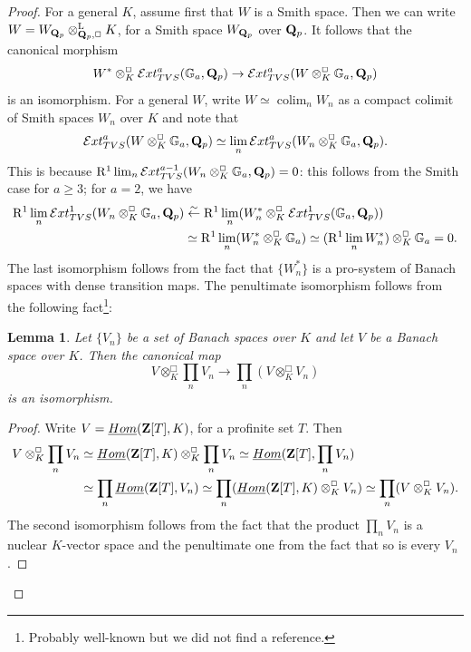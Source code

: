 \documentclass[10pt,reqno]{amsart}
\newtheorem{lemma}[equation]{Lemma}
\theoremstyle{definition}
\theoremstyle{remark}
\newcommand{\colim}{\operatorname{colim} }
\newcommand{\uHom}{\underline{{\rm{Hom}} }}
\newcommand{\LL}{\operatorname{L} }
\numberwithin{equation}{section}
\def\R{{\mathrm R}}
\def\Q{{\bf Q}} \def\Z{{\bf Z}}
\numberwithin{equation}{section}
\begin{document}
\begin{proof}
      For a general $K$,  assume first that $W$ is a Smith space. Then we can write $W=W_{\Q_p}\otimes^{\LL}_{\Q_p,\Box}K$, for a Smith space $W_{\Q_p}$ over $\Q_p$.
   It follows that the canonical morphism
   $$
   W^*\otimes^{\Box}_K    {\mathcal Ext}^a_{\rm TVS}(\mathbb{G}_a,\Q_p)\to     {\mathcal Ext}^a_{\rm TVS}(W\otimes^{\Box}_{K}\mathbb{G}_a,\Q_p)
   $$
   is an isomorphism. 
   For a general $W$,  write $W\simeq \colim_n W_n$ as a compact colimit of Smith spaces $W_n$ over $K$ and note that 
   $${\mathcal Ext}^a_{\rm TVS}(W\otimes^{\Box}_{K}\mathbb{G}_a,\Q_p)\simeq \lim_n {\mathcal Ext}^a_{\rm TVS}(W_n\otimes^{\Box}_{K}\mathbb{G}_a,\Q_p).
   $$
    This is because $\R^1\lim_n{\mathcal Ext}^{a-1}_{\rm TVS}(W_n\otimes^{\Box}_{K}\mathbb{G}_a,\Q_p)=0$: this  follows from the Smith case for $a\geq 3$; for $a=2$, we have 
   \begin{align*}
   \R^1\lim_n{\mathcal Ext}^{1}_{\rm TVS}(W_n\otimes^{\Box}_{K}\mathbb{G}_a,\Q_p) &     \stackrel{\sim}{\leftarrow} \R^1\lim_n(W^*_n\otimes^{\Box}_K{\mathcal Ext}^{1}_{\rm TVS}(\mathbb{G}_a,\Q_p))\\
    & \simeq \R^1\lim_n(W^*_n\otimes^{\Box}_K\mathbb{G}_a)
     \simeq  (\R^1\lim_nW^*_n)\otimes^{\Box}_K\mathbb{G}_a=0.
   \end{align*}
   The last isomorphism follows from the fact that  $\{W_n^*\}$ is a pro-system of Banach spaces with dense transition maps. The penultimate isomorphism follows from the following fact\footnote{Probably well-known but we did not find a reference.}:
   \begin{lemma}
   Let $\{V_n\}$ be a set of Banach spaces over $K$ and let $V$ be a Banach space over $K$. Then the canonical map
   $$
   V\otimes^{\Box}_K\prod_nV_n\to \prod_n(V\otimes^{\Box}_KV_n)
   $$
   is an isomorphism.
   \end{lemma}
   \begin{proof}
   Write $V=\uHom(\Z[T],K)$, for a profinite set $T$. Then
   \begin{align*}
   V\otimes^{\Box}_K\prod_nV_n & \simeq \uHom(\Z[T],K)\otimes^{\Box}_K\prod_nV_n\simeq \uHom(\Z[T],\prod_nV_n)\\
    & \simeq \prod_n\uHom(\Z[T],V_n)\simeq 
   \prod_n(\uHom(\Z[T],K)\otimes^{\Box}_KV_n)\simeq \prod_n(V\otimes^{\Box}_KV_n).
   \end{align*}
   The second isomorphism follows from the fact that the product $\prod_nV_n$ is a nuclear $K$-vector space and the penultimate one from the fact that so is every $V_n$. 
   \end{proof}

\end{proof}
\end{document}
